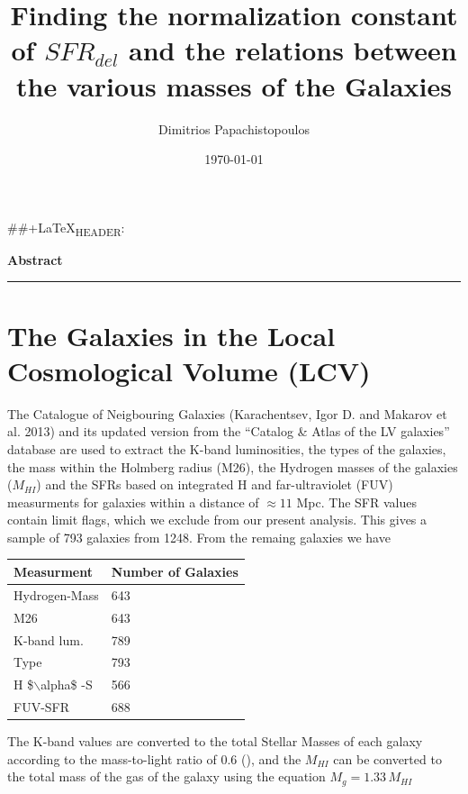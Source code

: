 \documentclass[a4paper]{article}
\author{Dimitrios Papachistopoulos}
\date{\today}
\title{Finding the normalization constant of \(SFR_{del}\) and the relations between the various masses of the Galaxies}
\begin{document}
\maketitle
\tableofcontents

\#\#+\LaTeX{}\textsubscript{HEADER}: 
\begin{ABSTRACT}


\textbf{Abstract}

\noindent\rule{\textwidth}{0.5pt}
\end{ABSTRACT}
\tableofcontents


\section{The Galaxies in the Local Cosmological Volume (LCV)}
\label{sec:org776cf02}

The Catalogue of Neigbouring Galaxies (Karachentsev, Igor D. and Makarov  et al. 2013\autocite{karachentsevUPDATEDNEARBYGALAXY2013}) and its updated version from the ``Catalog \& Atlas of the LV galaxies'' database \cite{CatalogLVGalaxies} are used to extract the K-band luminosities, the types of the galaxies, the mass within the Holmberg radius (M26), the Hydrogen masses of the galaxies (\(M_{HI}\)) and the SFRs based on integrated  H and far-ultraviolet (FUV) measurments for galaxies within a distance of
\(\approx 11\) Mpc. The SFR values contain limit flags, which we exclude from our present analysis. This gives a sample of 793 galaxies from 1248. From the remaing galaxies we have

\begin{center}
\begin{tabular}{|l|l|}
\hline
Measurment & Number of Galaxies \\
\hline
Hydrogen-Mass & 643 \\
M26 & 643 \\
K-band lum. & 789 \\
Type & 793 \\
H \$$\backslash$alpha\$ -S & 566 \\
FUV-SFR & 688 \\
\hline
\end{tabular}
\end{center}

The K-band values are converted to the total Stellar Masses of each galaxy according to the mass-to-light ratio of 0.6 (\cite{lelliSPARCMASSMODELS2016}), and the \(M_{HI}\) can be converted to the total mass of the gas of the galaxy using the equation \(M_g=1.33\,M_{HI}\)
\end{document}
